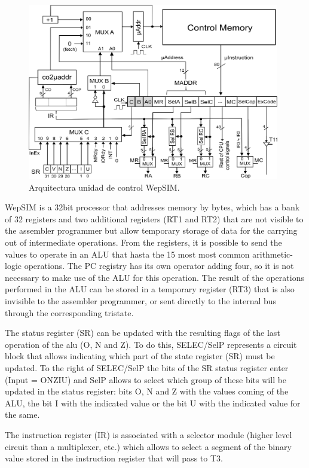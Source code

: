 \begin{figure}[htbp]
 	\centering
 	\includegraphics[width=11cm]{figures/controlunit6}
 	\caption{Arquitectura unidad de control WepSIM.}
	\label{fig:wepsimCU_figure_summary}
\end{figure}


WepSIM is a 32bit processor that addresses memory by bytes, which has a bank of 32 registers and two additional registers (RT1 and RT2) that are not visible to the assembler programmer but allow temporary storage of data for the carrying out of intermediate operations. From the registers, it is possible to send the values to operate in an ALU that hasta the 15 most most common arithmetic-logic operations.  The PC registry has its own operator adding four, so it is not necessary to make use of the ALU for this operation. The result of the operations performed in the ALU can be stored in a temporary register (RT3) that is also invisible to the assembler programmer, or sent directly to the internal bus through the corresponding tristate.


The status register (SR) can be updated with the resulting flags of the last operation of the alu (O, N and Z). To do this, SELEC/SelP represents a circuit block that allows indicating which part of the state register (SR) must be updated. To the right of SELEC/SelP the bits of the SR status register enter (Input = ONZIU) and SelP allows to select which group of these bits will be updated in the status register: bits O, N and Z with the values coming of the ALU, the bit I with the indicated value or the bit U with the indicated value for the same.

The instruction register (IR) is associated with a selector module (higher level circuit than a multiplexer, etc.) which allows to select a segment of the binary value stored in the instruction register that will pass to T3.

